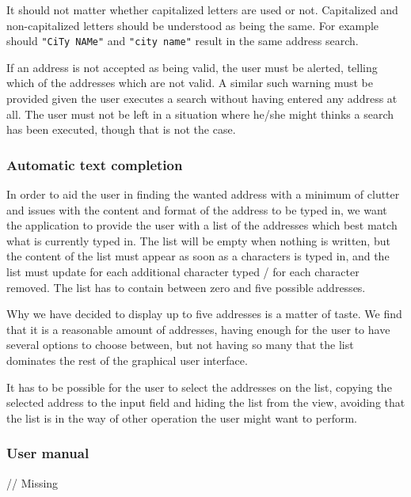\documentclass[a4paper,11pt]{article}
\begin{document}
It should not matter whether capitalized letters are used or not. Capitalized and non-capitalized letters should be understood as being the same. For example should \texttt{"CiTy NAMe"} and \texttt{"city name"} result in the same address search.

If an address is not accepted as being valid, the user must be alerted, telling which of the addresses which are not valid. A similar such warning must be provided given the user executes a search without having entered any address at all. The user must not be left in a situation where he/she might thinks a search has been executed, though that is not the case.

\subsubsection{Automatic text completion}
In order to aid the user in finding the wanted address with a minimum of clutter and issues with the content and format of the address to be typed in, we want the application to provide the user with a list of the addresses which best match what is currently typed in. The list will be empty when nothing is written, but the content of the list must appear as soon as a characters is typed in, and the list must update for each additional character typed / for each character removed. The list has to contain between zero and five possible addresses.

Why we have decided to display up to five addresses is a matter of taste. We find that it is a reasonable amount of addresses, having enough for the user to have several options to choose between, but not having so many that the list dominates the rest of the graphical user interface.

It has to be possible for the user to select the addresses on the list, copying the selected address to the input field and hiding the list from the view, avoiding that the list is in the way of other operation the user might want to perform.

\subsubsection{User manual}
// Missing
\end{document}
